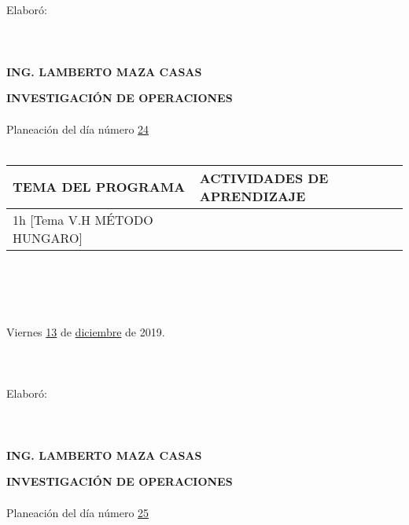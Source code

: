 \documentclass[landscape]{article}
\begin{document}
{\begin{center}
\ \\
\ \\
\ \\
\ \\
Elabor\'o:
\ \\
\ \\
\ \\
\ \\
{\bf ING. LAMBERTO MAZA CASAS}
\end{center}
\eject
\begin{center}
{\bf 
INVESTIGACI\'ON DE OPERACIONES
}
\ \\
\ \\
Planeaci\'on del d\'ia n\'umero \underline{\hspace{0.5cm}24\hspace{0.5cm}}
\ \\
\ \\
\begin{tabular}{|p{11cm}|p{8cm}|}\hline
{\bf TEMA DEL PROGRAMA}&{\bf ACTIVIDADES DE APRENDIZAJE}\\\hline
	1h	[Tema V.H M\'ETODO HUNGARO]
&\\
\hline
\end{tabular}
\ \\
\ \\
\ \\
\ \\
Viernes \underline{\hspace{0.5cm}13\hspace{0.5cm}} de  \underline{\hspace{0.5cm}diciembre\hspace{0.5cm}} de 2019.
\ \\
\ \\
\ \\
\ \\
Elabor\'o:
\ \\
\ \\
\ \\
\ \\
{\bf ING. LAMBERTO MAZA CASAS}
\end{center}
\eject
\begin{center}
{\bf 
INVESTIGACI\'ON DE OPERACIONES
}
\ \\
\ \\
Planeaci\'on del d\'ia n\'umero \underline{\hspace{0.5cm}25\hspace{0.5cm}}
\ \\
\ \\
\begin{tabular}{|p{11cm}|p{8cm}|}\hline

\end{tabular}
\end{center}}
\end{document}
